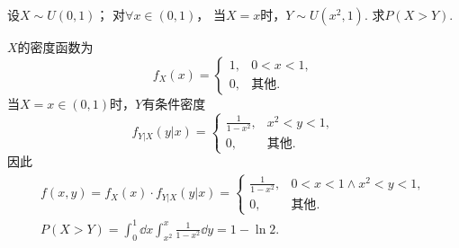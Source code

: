 \begin{example}
设\(X \sim U(0,1)\)；
对\(\forall x\in(0,1)\)，
当\(X=x\)时，\(Y \sim U(x^2,1)\).
求\(P(X > Y)\).
\begin{solution}
\(X\)的密度函数为\begin{equation*}
	f_X(x) = \left\{ \begin{array}{cl}
		1, & 0<x<1, \\
		0, & \text{其他}.
	\end{array} \right.
\end{equation*}
当\(X=x\in(0,1)\)时，\(Y\)有条件密度\begin{equation*}
	f_{Y \vert X}(y \vert x)
	= \left\{ \begin{array}{cl}
		\frac{1}{1-x^2}, & x^2<y<1, \\
		0, & \text{其他}.
	\end{array} \right.
\end{equation*}
因此\begin{gather*}
	f(x,y) = f_X(x) \cdot f_{Y \vert X}(y \vert x)
	= \left\{ \begin{array}{cl}
		\frac{1}{1-x^2}, & 0<x<1 \land x^2<y<1, \\
		0, & \text{其他}.
	\end{array} \right. \\
	P(X > Y)
	= \int_0^1 \dd{x} \int_{x^2}^x \frac{1}{1-x^2} \dd{y}
	= 1 - \ln2.
\end{gather*}
\end{solution}
\end{example}

